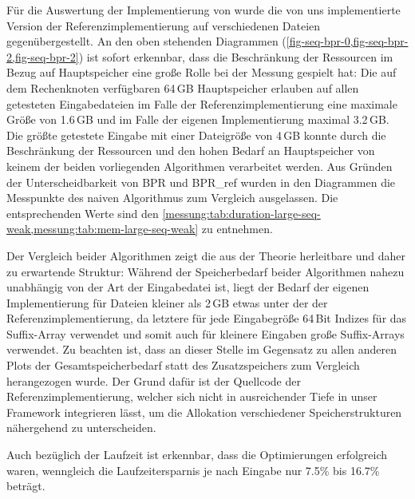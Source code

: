 Für die Auswertung der Implementierung von \bpr wurde die von uns implementierte Version der Referenzimplementierung auf verschiedenen Dateien gegenübergestellt.
An den oben stehenden Diagrammen (\cref{fig-seq-bpr-0,fig-seq-bpr-2,fig-seq-bpr-2}) ist sofort erkennbar, dass die Beschränkung der Ressourcen im Bezug auf Hauptspeicher eine große Rolle bei der Messung gespielt hat:
Die auf dem Rechenknoten verfügbaren 64\,GB Hauptspeicher erlauben auf allen getesteten Eingabedateien im Falle der Referenzimplementierung eine maximale Größe von 1.6\,GB und im Falle der eigenen Implementierung maximal 3.2\,GB.
Die größte getestete Eingabe mit einer Dateigröße von 4\,GB konnte durch die Beschränkung der Ressourcen und den hohen Bedarf an Hauptspeicher von keinem der beiden vorliegenden Algorithmen verarbeitet werden.
Aus Gründen der Unterscheidbarkeit von BPR und BPR\_ref wurden in den Diagrammen die Messpunkte des naiven Algorithmus zum Vergleich ausgelassen.
Die entsprechenden Werte sind den \cref{messung:tab:duration-large-seq-weak,messung:tab:mem-large-seq-weak} zu entnehmen.\par
Der Vergleich beider Algorithmen zeigt die aus der Theorie herleitbare und daher zu erwartende Struktur:
Während der Speicherbedarf beider Algorithmen nahezu unabhängig von der Art der Eingabedatei ist, liegt der Bedarf der eigenen Implementierung für Dateien kleiner als 2\,GB etwas unter der der Referenzimplementierung, da letztere für jede Eingabegröße 64\,Bit Indizes für das Suffix-Array verwendet und somit auch für kleinere Eingaben große Suffix-Arrays verwendet.
Zu beachten ist, dass an dieser Stelle im Gegensatz zu allen anderen Plots der Gesamtspeicherbedarf statt des Zusatzspeichers zum Vergleich herangezogen wurde.
Der Grund dafür ist der Quellcode der Referenzimplementierung, welcher sich nicht in ausreichender Tiefe in unser Framework integrieren lässt, um die Allokation verschiedener Speicherstrukturen nähergehend zu unterscheiden.\par
Auch bezüglich der Laufzeit ist erkennbar, dass die Optimierungen erfolgreich waren, wenngleich die Laufzeitersparnis je nach Eingabe nur 7.5\% bis 16.7\% beträgt.

